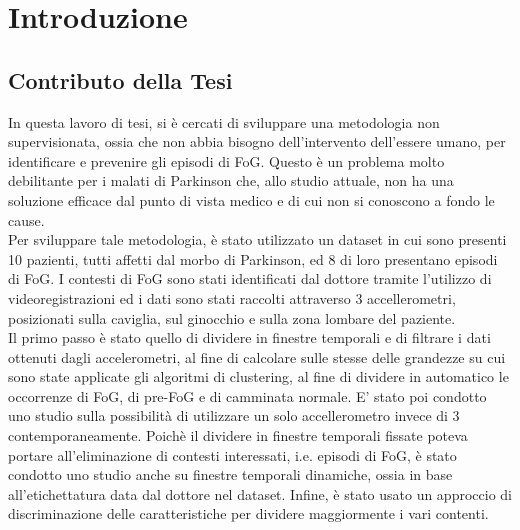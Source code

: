 


\chapter{Introduzione}\label{cap1:Introduzione}




\section{Contributo della Tesi}\label{cap1:Contributo della Tesi}
In questa lavoro di tesi, si è cercati di sviluppare una metodologia non supervisionata, ossia che non abbia bisogno dell'intervento dell'essere umano, per identificare e prevenire gli episodi di FoG. Questo è un problema molto debilitante per i malati di Parkinson che, allo studio attuale, non ha una soluzione efficace dal punto di vista medico e di cui non si conoscono a fondo le cause.\\
Per sviluppare tale metodologia, è stato utilizzato un dataset in cui sono presenti 10 pazienti, tutti affetti dal morbo di Parkinson, ed 8 di loro presentano episodi di FoG. I contesti di FoG sono stati identificati dal dottore tramite l'utilizzo di videoregistrazioni ed i dati sono stati raccolti attraverso 3 accellerometri, posizionati sulla caviglia, sul ginocchio e sulla zona lombare del paziente.\\
Il primo passo è stato quello di dividere in finestre temporali e di filtrare i dati ottenuti dagli accelerometri, al fine di calcolare sulle stesse delle grandezze su cui sono state applicate gli algoritmi di clustering, al fine di dividere in automatico le occorrenze di FoG, di pre-FoG e di camminata normale. E' stato poi condotto uno studio sulla possibilità di utilizzare un solo accellerometro invece di 3 contemporaneamente. Poichè il dividere in finestre temporali fissate poteva portare all'eliminazione di contesti interessati, i.e. episodi di FoG, è stato condotto uno studio anche su finestre temporali dinamiche, ossia in base all'etichettatura data dal dottore nel dataset. Infine, è stato usato un approccio di discriminazione delle caratteristiche per dividere maggiormente i vari contenti.

